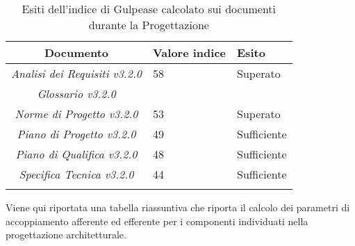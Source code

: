 \begin{longtable}{|c|p{3cm}|p{3cm}|}
\toprule
\textbf{Documento} & \textbf{Valore indice} & \textbf{Esito} \\


\midrule
\emph{Analisi dei Requisiti v3.2.0} & 58 & Superato \\
\midrule
\emph{Glossario v3.2.0} &  & \\
\midrule
\emph{Norme di Progetto v3.2.0} & 53  & Superato\\
\midrule
\emph{Piano di Progetto v3.2.0} & 49  & Sufficiente\\
\midrule
\emph{Piano di Qualifica v3.2.0} & 48  & Sufficiente\\
\midrule
\emph{Specifica Tecnica v3.2.0} & 44 & Sufficiente\\
\bottomrule
\caption{Esiti dell'indice di Gulpease calcolato sui documenti durante la Progettazione}
\label{tab:changelog}
\end{longtable}

Viene qui riportata una tabella riassuntiva che riporta il calcolo dei parametri di accoppiamento afferente ed efferente per i componenti individuati nella progettazione architetturale.

